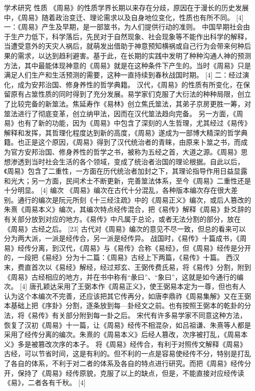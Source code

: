 \documentclass[a4paper,12pt,UTF8,twoside]{ctexbook}
\begin{document}
学术研究
性质
《周易》的性质学界长期以来存在分歧，原因在于漫长的历史发展中，《周易》随着政治变迁、理论需求以及自身地位变化，性质也有所不同。 [4]
一：《周易》产生及早期，是一部筮书，为人们提供行动的准则。
中国早期社会由于生产力低下，科学落后，先民对于自然现象、社会现象等不能作出科学的解释，当遭受意外的天灾人祸后，就萌发出借助于神意预知横祸或自己行为会带来何种后果的需求，以达到趋利避害。基于此，在长期的实践中发明了种种沟通人神的预测方法，其中最能体现神意的《周易》就是在这种条件下产生的。当时《周易》只是满足人们生产和生活预测的需要，这种一直持续到春秋战国时期。 [4]
二：经过演化，成为安邦治国、修身养性的哲学典籍。
汉代，《周易》的性质有所变化，在保留原有占筮性质的同时得到了充分发展。易学家们克服了大衍法的种种局限，创立了比较完备的新筮法。焦延寿作《易林》创立焦氏筮法，其弟子京房更胜一筹，对筮法进行了彻底变革，创立纳甲法，因而在汉代筮法趋向完备。
另一方面，《周易》也有了新的功能，因为《周易》中包含了深刻的人生哲理，尤其经过《易传》解释和发挥，其哲理化程度达到新的高度，《周易》遂成为一部博大精深的哲学典籍。也正是这个原因，《周易》得到了汉代统治者的青睐，由原来卜筮之书，而成为官方安邦治国、修身养性的哲学之书，被称为五经之首，大道之源。《周易》思想渗透到当时社会生活的各个领域，变成了统治者治国的理论根据。自此以后，《周易》包含了二重性，一方面在历代统治者加封之下，其理论指导作用日益显露和光大；另一方面，民间术士不断更新，完善筮法体系，至今《周易》二重性还是十分明显。 [4]
编次
《周易》编次在古代十分混乱，各种版本编次存在很大差别。通行的编次是阮元所刻《十三经注疏》中的《周易正义》编次，或后人篡改的朱熹《周易本义》编次，其编次特点经传混合，把《易传》解释《周易》卦爻辞的有关部分放到对应的地方。《易传》中凡属于总论，或者无法分割的部分，放在《周易》古经之后。 [23]
古代对《周易》编次的意见不尽一致，但总的看来可以分为两大派，一派是经传合，另一派是经传异。
战国时，《易传》十篇成书，《周易》经传分离，到汉代，《周易》与《易传》合称《易经》，但《周易》经传是分开的，一段把《易经》分为十二篇：《周易》古经上下两篇，《易传》十篇。
西汉末，费直首次以《易经》解经，经过郑玄、王弼传费氏易，将《易传》分割，附到《周易》古经相应的地方，并在书中称有“彖曰”、“象曰”，这就是如今通行的编次。 [4]
唐孔颖达采用了王弼本作《周易正义》，使王弼易本定为一尊，但也有人认为这个本编次不完善，还应该把其它传再分，如唐李鼎祚《周易集解》又在王弼本基础上把《序卦》分割，逐条放到每—卦经文之前。也有按照王弼本的乾卦的分法，将《易传》有关部分附到每一卦之后。
宋代有许多易学家不同意这种方法，恢复了汉初《周易》十一篇，让《周易》经传不相混杂，如吕祖谦、朱熹等人都是采用了经传分离的编次。朱熹的《周易本义》后经人篡改，次序被打乱，《周易本义》多是被篡改次序的本子。
将《周易》经传合，有利于对照传文解释《周易》古经，可以节省时间，这是有利的。但不利的一点是容易使经传不分，特别是打乱了各自的体系，不利于对二者的体系及各自的特点进行研究。而把《周易》经传分开，保持了《周易》经传原貌，克服了以上的缺点，但是，不能直接对应经传读《易》，二者各有千秋。 [4]
\end{document}
